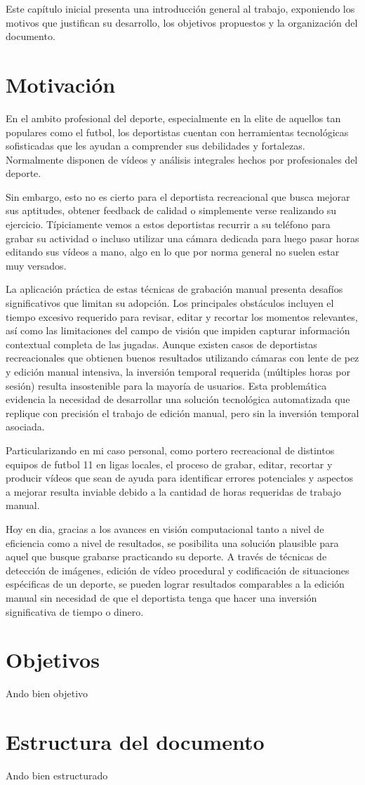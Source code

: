 Este capítulo inicial presenta una introducción general al trabajo, exponiendo los motivos que justifican su desarrollo, los objetivos propuestos y la organización del documento.

\section[Motivación]{Motivación}
En el ambito profesional del deporte, especialmente en la elite de aquellos tan populares como el futbol, los deportistas cuentan con herramientas tecnológicas sofisticadas que les ayudan a comprender sus debilidades y fortalezas. Normalmente disponen de vídeos y 
análisis integrales hechos por profesionales del deporte.

Sin embargo, esto no es cierto para el deportista recreacional que busca mejorar sus aptitudes, obtener feedback de calidad o simplemente verse realizando su ejercicio. Típiciamente vemos a estos deportistas recurrir a su teléfono para grabar su actividad o incluso utilizar una cámara dedicada para luego pasar horas editando sus vídeos a mano, algo en lo que por norma general no suelen estar muy versados.

La aplicación práctica de estas técnicas de grabación manual presenta desafíos significativos que limitan su adopción. Los principales obstáculos incluyen el tiempo excesivo requerido para revisar, editar y recortar los momentos relevantes, así como las limitaciones del campo de visión que impiden capturar información contextual completa de las jugadas. Aunque existen casos de deportistas recreacionales que obtienen buenos resultados utilizando cámaras con lente de pez y edición manual intensiva, la inversión temporal requerida (múltiples horas por sesión) resulta insostenible para la mayoría de usuarios. Esta problemática evidencia la necesidad de desarrollar una solución tecnológica automatizada que replique con precisión el trabajo de edición manual, pero sin la inversión temporal asociada.

Particularizando en mi caso personal, como portero recreacional de distintos equipos de futbol 11 en ligas locales, el proceso de grabar, editar, recortar y producir vídeos que sean de ayuda para identificar errores potenciales y aspectos a mejorar resulta inviable debido a la cantidad de horas requeridas de trabajo manual.

Hoy en dia, gracias a los avances en visión computacional tanto a nivel de eficiencia como a nivel de resultados, se posibilita una solución plausible para aquel que busque grabarse practicando su deporte. A través de técnicas de detección de imágenes, edición de vídeo procedural y codificación de situaciones espécificas de un deporte, se pueden lograr resultados comparables a la edición manual sin necesidad de que el deportista tenga que hacer una inversión significativa de tiempo o dinero.

\section[Objetivos]{Objetivos}
Ando bien objetivo

\section[Estructura del documento]{Estructura del documento}
Ando bien estructurado
